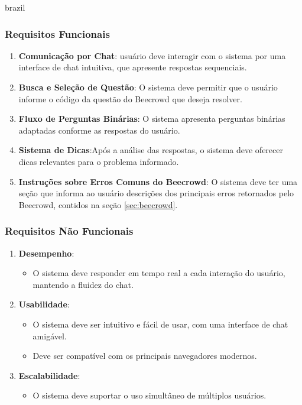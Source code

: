 \begin{otherlanguage*}{brazil}
\subsubsection{Requisitos Funcionais}

\begin{enumerate}[label=RF\arabic* –]
    \item \textbf{Comunicação por Chat}: usuário deve interagir com o sistema por uma interface de chat intuitiva, que apresente respostas sequenciais.
    \item \textbf{Busca e Seleção de Questão}: O sistema deve permitir que o usuário informe o código da questão do Beecrowd que deseja resolver.
    \item \textbf{Fluxo de Perguntas Binárias}: O sistema apresenta perguntas binárias adaptadas conforme as respostas do usuário.
    \item \textbf{Sistema de Dicas}:Após a análise das respostas, o sistema deve oferecer dicas relevantes para o problema informado.
    \item \textbf{Instruções sobre Erros Comuns do Beecrowd}: O sistema deve ter uma seção que informa ao usuário descrições dos principais erros retornados pelo Beecrowd, contidos na seção \ref{sec:beecrowd}.
\end{enumerate}

\subsubsection{Requisitos Não Funcionais}

\begin{enumerate}[label=RNF\arabic* –]
    \item \textbf{Desempenho}:
    \begin{itemize}
        \item O sistema deve responder em tempo real a cada interação do usuário, mantendo a fluidez do chat.
    \end{itemize}
    
    \item \textbf{Usabilidade}:
    \begin{itemize}
        \item O sistema deve ser intuitivo e fácil de usar, com uma interface de chat amigável.
        \item Deve ser compatível com os principais navegadores modernos.
    \end{itemize}

    \item \textbf{Escalabilidade}:
    \begin{itemize}
        \item O sistema deve suportar o uso simultâneo de múltiplos usuários.
    \end{itemize}
    

\end{enumerate}
\end{otherlanguage*}
